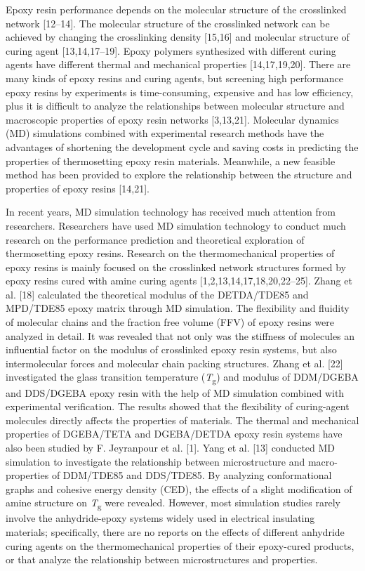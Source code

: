 \documentclass{article}
\begin{document}
Epoxy resin performance depends on the molecular structure of the crosslinked network [12–14]. The molecular structure of the crosslinked network can be achieved by changing the crosslinking density [15,16] and molecular structure of curing agent [13,14,17–19]. Epoxy polymers synthesized with different curing agents have different thermal and mechanical properties [14,17,19,20]. There are many kinds of epoxy resins and curing agents, but screening high performance epoxy resins by experiments is time-consuming, expensive and has low efficiency, plus it is difficult to analyze the relationships between molecular structure and macroscopic properties of epoxy resin networks [3,13,21]. Molecular dynamics (MD) simulations combined with experimental research methods have the advantages of shortening the development cycle and saving costs in predicting the properties of thermosetting epoxy resin materials. Meanwhile, a new feasible method has been provided to explore the relationship between the structure and properties of epoxy resins [14,21].

In recent years, MD simulation technology has received much attention from researchers. Researchers have used MD simulation technology to conduct much research on the performance prediction and theoretical exploration of thermosetting epoxy resins. Research on the thermomechanical properties of epoxy resins is mainly focused on the crosslinked network structures formed by epoxy resins cured with amine curing agents [1,2,13,14,17,18,20,22–25]. Zhang et al. [18] calculated the theoretical modulus of the DETDA/TDE85 and MPD/TDE85 epoxy matrix through MD simulation. The flexibility and fluidity of molecular chains and the fraction free volume (FFV) of epoxy resins were analyzed in detail. It was revealed that not only was the stiffness of molecules an influential factor on the modulus of crosslinked epoxy resin systems, but also intermolecular forces and molecular chain packing structures. Zhang et al. [22] investigated the glass transition temperature (\emph{T}\textsubscript{g}) and modulus of DDM/DGEBA and DDS/DGEBA epoxy resin with the help of MD simulation combined with experimental verification. The results showed that the flexibility of curing-agent molecules directly affects the properties of materials. The thermal and mechanical properties of DGEBA/TETA and DGEBA/DETDA epoxy resin systems have also been studied by F. Jeyranpour et al. [1]. Yang et al. [13] conducted MD simulation to investigate the relationship between microstructure and macro-properties of DDM/TDE85 and DDS/TDE85. By analyzing conformational graphs and cohesive energy density (CED), the effects of a slight modification of amine structure on \emph{T}\textsubscript{g} were revealed. However, most simulation studies rarely involve the anhydride-epoxy systems widely used in electrical insulating materials; specifically, there are no reports on the effects of different anhydride curing agents on the thermomechanical properties of their epoxy-cured products, or that analyze the relationship between microstructures and properties.
\end{document}

